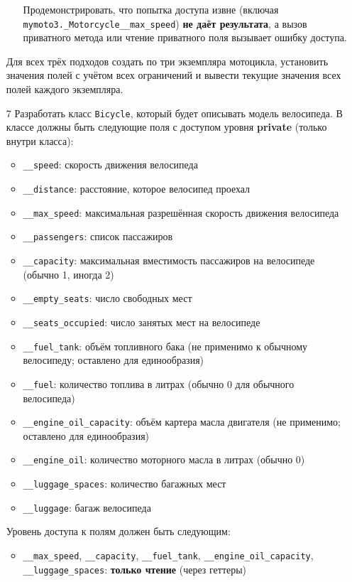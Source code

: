 \begin{enumerate}
\begin{enumerate}
    Продемонстрировать, что попытка доступа извне (включая \texttt{mymoto3.\_Motorcycle\_\_max\_speed}) \textbf{не даёт результата}, а вызов приватного метода или чтение приватного поля вызывает ошибку доступа.
\end{enumerate}
Для всех трёх подходов создать по три экземпляра мотоцикла, установить значения полей с учётом всех ограничений и вывести текущие значения всех полей каждого экземпляра.
\item[7] Разработать класс \texttt{Bicycle}, который будет описывать модель велосипеда. В классе должны быть следующие поля с доступом уровня \textbf{private} (только внутри класса):
\begin{itemize}
    \item \texttt{\_\_speed}: скорость движения велосипеда  
    \item \texttt{\_\_distance}: расстояние, которое велосипед проехал  
    \item \texttt{\_\_max\_speed}: максимальная разрешённая скорость движения велосипеда  
    \item \texttt{\_\_passengers}: список пассажиров  
    \item \texttt{\_\_capacity}: максимальная вместимость пассажиров на велосипеде (обычно 1, иногда 2)  
    \item \texttt{\_\_empty\_seats}: число свободных мест  
    \item \texttt{\_\_seats\_occupied}: число занятых мест на велосипеде  
    \item \texttt{\_\_fuel\_tank}: объём топливного бака (не применимо к обычному велосипеду; оставлено для единообразия)  
    \item \texttt{\_\_fuel}: количество топлива в литрах (обычно 0 для обычного велосипеда)  
    \item \texttt{\_\_engine\_oil\_capacity}: объём картера масла двигателя (не применимо; оставлено для единообразия)  
    \item \texttt{\_\_engine\_oil}: количество моторного масла в литрах (обычно 0)  
    \item \texttt{\_\_luggage\_spaces}: количество багажных мест  
    \item \texttt{\_\_luggage}: багаж велосипеда  
\end{itemize}
Уровень доступа к полям должен быть следующим:
\begin{itemize}
    \item \texttt{\_\_max\_speed}, \texttt{\_\_capacity}, \texttt{\_\_fuel\_tank}, \texttt{\_\_engine\_oil\_capacity}, \texttt{\_\_luggage\_spaces}: \textbf{только чтение} (через геттеры)  

\end{itemize}
\end{enumerate}
